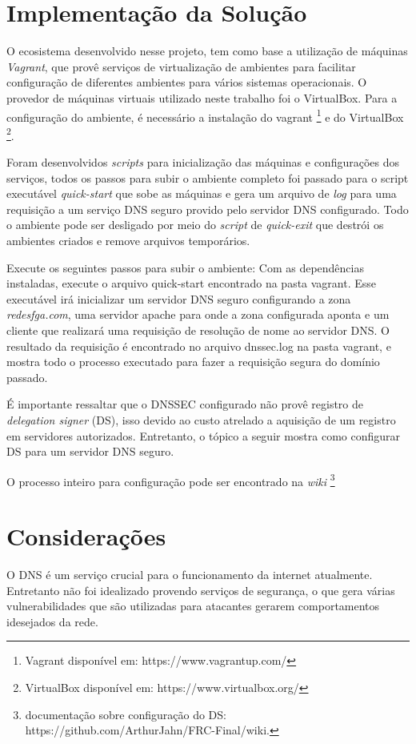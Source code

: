 \documentclass[a4paper]{report} %
\begin{document}
\section{Implementação da Solução}
O ecosistema desenvolvido nesse projeto, tem como base a utilização de máquinas \textit{Vagrant}, que provê serviços de virtualização de ambientes para facilitar configuração de diferentes ambientes para vários sistemas operacionais. O provedor de máquinas virtuais utilizado neste trabalho foi o VirtualBox. Para a configuração do ambiente, é necessário a instalação do vagrant \footnote{Vagrant disponível em: https://www.vagrantup.com/} e do VirtualBox \footnote{VirtualBox disponível em: https://www.virtualbox.org/}.

Foram desenvolvidos \textit{scripts} para inicialização das máquinas e configurações dos serviços, todos os passos para subir o ambiente completo foi passado para o script executável \textit{quick-start} que sobe as máquinas e gera um arquivo de \textit{log} para uma requisição a um serviço DNS seguro provido pelo servidor DNS configurado. Todo o ambiente pode ser desligado por meio do \textit{script} de \textit{quick-exit} que destrói os ambientes criados e remove arquivos temporários.

Execute os seguintes passos para subir o ambiente: Com as dependências instaladas, execute o arquivo quick-start encontrado na pasta vagrant. Esse executável irá inicializar um servidor DNS seguro configurando a zona \textit{redesfga.com}, uma servidor apache para onde a zona configurada aponta e um cliente que realizará uma requisição de resolução de nome ao servidor DNS. O resultado da requisição é encontrado no arquivo dnssec.log na pasta vagrant, e mostra todo o processo executado para fazer a requisição segura do domínio passado.

É importante ressaltar que o DNSSEC configurado não provê registro de \textit{delegation signer} (DS), isso devido ao custo atrelado a aquisição de um registro em servidores autorizados. Entretanto, o tópico a seguir mostra como configurar DS para um servidor DNS seguro.

O processo inteiro para configuração pode ser encontrado na \textit{wiki} \footnote{documentação sobre configuração do DS: https://github.com/ArthurJahn/FRC-Final/wiki.}  
\section{Considerações}

O DNS é um serviço crucial para o funcionamento da internet atualmente. Entretanto não foi idealizado provendo serviços de segurança, o que gera várias vulnerabilidades que são utilizadas para atacantes gerarem comportamentos idesejados da rede. 
\end{document}

